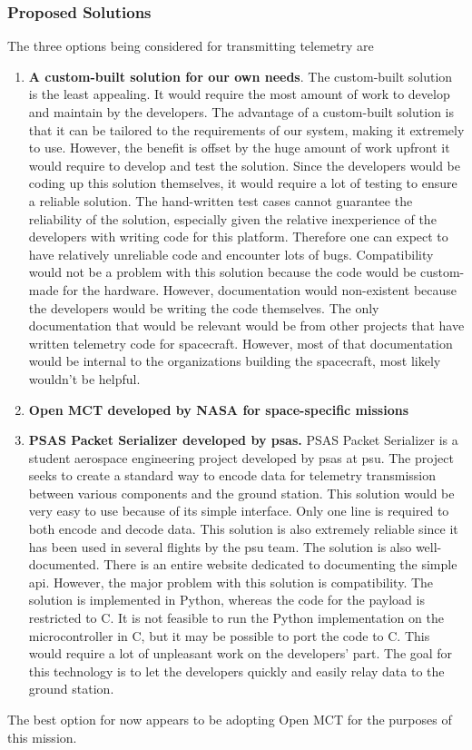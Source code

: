 \documentclass[letterpaper,10pt]{article}
\begin{document}
\subsubsection{Proposed Solutions}
The three options being considered for transmitting telemetry are
\begin{enumerate}
\item{
\textbf{A custom-built solution for our own needs}.
The custom-built solution is the least appealing. It would require the most amount of work to develop and maintain by the developers.
The advantage of a custom-built solution is that it can be tailored to the requirements of our system, making it extremely to use.
However, the benefit is offset by the huge amount of work upfront it would require to develop and test the solution.
Since the developers would be coding up this solution themselves, it would require a lot of testing to ensure a reliable solution.
The hand-written test cases cannot guarantee the reliability of the solution, 
especially given the relative inexperience of the developers with writing code for this platform.
Therefore one can expect to have relatively unreliable code and encounter lots of bugs.
Compatibility would not be a problem with this solution because the code would be custom-made for the hardware.
However, documentation would non-existent because the developers would be writing the code themselves.
The only documentation that would be relevant would be from other projects that have written telemetry code for spacecraft.
However, most of that documentation would be internal to the organizations building the spacecraft,
most likely wouldn't be helpful.
}

\item{
\textbf{Open MCT developed by NASA for space-specific missions}
}

\item{
\textbf{PSAS Packet Serializer developed by \gls{psas}.}
PSAS Packet Serializer is a student aerospace engineering project developed by \gls{psas} at \gls{psu}. 
The project seeks to create a standard way to encode data for telemetry transmission between various components
and the ground station.
This solution would be very easy to use because of its simple interface.
Only one line is required to both encode and decode data.
This solution is also extremely reliable since it has been used in several flights by the \gls{psu} team.
The solution is also well-documented.
There is an entire website dedicated to documenting the simple \gls{api}.
However, the major problem with this solution is compatibility.
The solution is implemented in Python, whereas the code for the \gls{payload} is restricted to C.
It is not feasible to run the Python implementation on the microcontroller in C,
but it may be possible to \gls{port} the code to C.
This would require a lot of unpleasant work on the developers' part.
The goal for this technology is to let the developers quickly and easily relay data to the ground station.
}
\end{enumerate}
The best option for now appears to be adopting Open MCT for the purposes of this mission.
\end{document}
